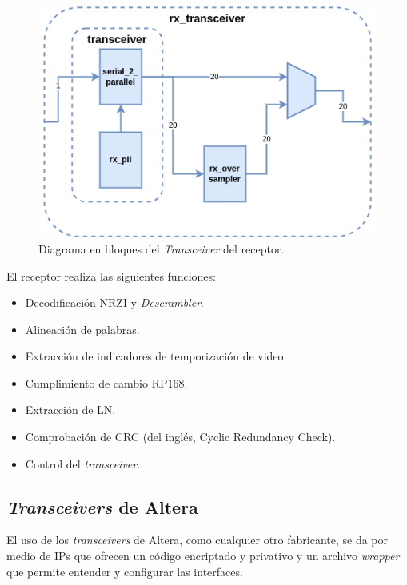   \begin{figure}[htbp]
      \centering
      \includegraphics[width=\linewidth]{./Figures/rx_xcvr.png}
      \caption{Diagrama en bloques del \textit{Transceiver} del receptor.}\label{fig:rx_xcvr}
  \end{figure}
  \vspace{1cm}

  El receptor realiza las siguientes funciones:
  \begin{itemize}
      \item Decodificación NRZI y \textit{Descrambler}.
      \item Alineación de palabras.
      \item Extracción de indicadores de temporización de video.
      \item Cumplimiento de cambio RP168.
      \item Extracción de LN\@.
      \item Comprobación de CRC  (del inglés, Cyclic Redundancy Check)\@.
      \item Control del \textit{transceiver}.
  \end{itemize}

\subsection{\textit{Transceivers} de Altera}

  El uso de los \textit{transceivers} de Altera, como cualquier otro fabricante,
  se da por medio de IPs que ofrecen un código encriptado y privativo y un
  archivo \textit{wrapper} que permite entender y configurar las interfaces.

